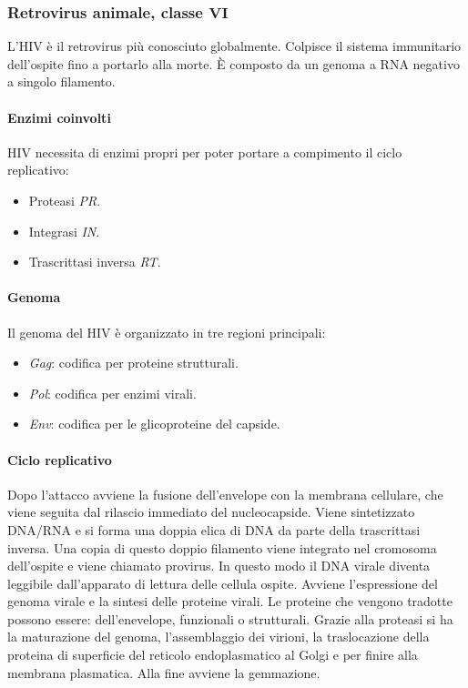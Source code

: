 			
		\subsubsection{Retrovirus animale, classe $\mathbf{VI}$}
		L'HIV \`e il retrovirus pi\`u conosciuto globalmente. 
		Colpisce il sistema immunitario dell'ospite fino a portarlo alla morte. 
		\`E composto da un genoma a RNA negativo a singolo filamento. 

			\paragraph{Enzimi coinvolti}
			HIV necessita di enzimi propri per poter portare a compimento il ciclo replicativo:
			\begin{multicols}{2}
				\begin{itemize}
					\item Proteasi \emph{PR}. 
					\item Integrasi \emph{IN}. 
					\item Trascrittasi inversa \emph{RT}.
				\end{itemize}
			\end{multicols}

			\paragraph{Genoma}
			Il genoma del HIV \`e organizzato in tre regioni principali:
			\begin{multicols}{2}
				\begin{itemize}
    					\item \emph{Gag}: codifica per proteine strutturali.
					\item \emph{Pol}: codifica per enzimi virali.
					\item \emph{Env}: codifica per le glicoproteine del capside. 
				\end{itemize}
			\end{multicols}

			\paragraph{Ciclo replicativo}
			Dopo l'attacco avviene la fusione dell'envelope con la membrana cellulare, che viene seguita dal rilascio immediato del nucleocapside. 
			Viene sintetizzato DNA/RNA e si forma una doppia elica di DNA da parte della trascrittasi inversa. 
			Una copia di questo doppio filamento viene integrato nel cromosoma dell'ospite e viene chiamato provirus. 
			In questo modo il DNA virale diventa leggibile dall'apparato di lettura delle cellula ospite. 
			Avviene l'espressione del genoma virale e la sintesi delle proteine virali. 
			Le proteine che vengono tradotte possono essere: dell'enevelope, funzionali o strutturali. 
			Grazie alla proteasi si ha la maturazione del genoma, l'assemblaggio dei virioni, la traslocazione della proteina di superficie del reticolo endoplasmatico al Golgi e per finire alla membrana plasmatica. 
			Alla fine avviene la gemmazione. 


